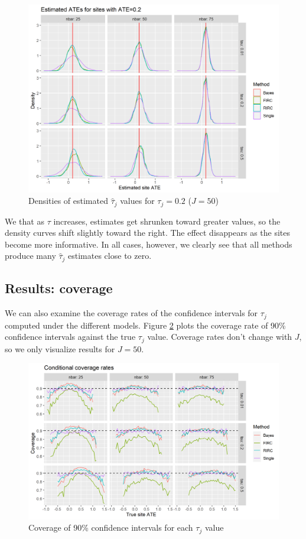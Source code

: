 \documentclass[]{article}
\begin{document}
\begin{figure}[ht]
	\centering
	\includegraphics[width=\textwidth]{power_plot_ATE02_dens}
	\caption{Densities of estimated $\hat{\tau}_j$ values for $\tau_j = 0.2$ ($J = 50$)}
	\label{fig:power_plot_dens}
\end{figure}

We that as $\tau$ increases, estimates get shrunken toward greater values, so the density curves shift slightly toward the right.
The effect disappears as the sites become more informative.
In all cases, however, we clearly see that all methods produce many $\hat{\tau}_j$ estimates close to zero.

\subsection{Results: coverage}

We can also examine the coverage rates of the confidence intervals for $\tau_j$ computed under the different models.
Figure \ref{fig:coverage_plot} plots the coverage rate of 90\% confidence intervals against the true $\tau_j$ value.
Coverage rates don't change with $J$, so we only visualize results for $J = 50$.

\begin{figure}[ht]
	\centering
	\includegraphics[width=\textwidth]{coverage_plot}
	\caption{Coverage of 90\% confidence intervals for each $\tau_j$ value}
	\label{fig:coverage_plot}
\end{figure}
\end{document}
